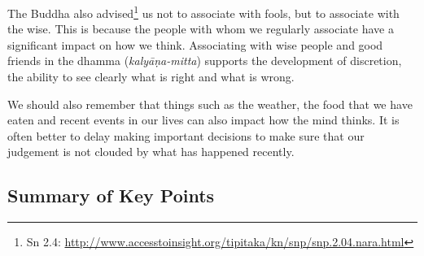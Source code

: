 The Buddha also advised\footnote{Sn 2.4: \url{http://www.accesstoinsight.org/tipitaka/kn/snp/snp.2.04.nara.html}} us not to associate with fools, but to associate with the wise. This is because the people with whom we regularly associate have a significant impact on how we think. Associating with wise people and good friends in the dhamma (\textit{kalyāṇa-mitta}) supports the development of discretion, the ability to see clearly what is right and what is wrong.

We should also remember that things such as the weather, the food that we have eaten and recent events in our lives can also impact how the mind thinks. It is often better to delay making important decisions to make sure that our judgement is not clouded by what has happened recently.

\pagebreak

\subsection*{Summary of Key Points}

